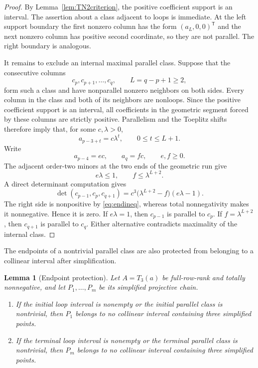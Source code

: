 \documentclass{amsart}
\numberwithin{equation}{section}
\newtheorem{lemma}[theorem]{Lemma}
\theoremstyle{definition}
\theoremstyle{remark}
\newcommand{\transpose}{\mathsf T}
\begin{document}
\begin{proof}
By Lemma~\ref{lem:TN2criterion}, the positive coefficient support is an interval.  The assertion about a class adjacent to loops is immediate.  At the left support boundary the first nonzero column has the form $(a_L,0,0)^{\transpose}$ and the next nonzero column has positive second coordinate, so they are not parallel.  The right boundary is analogous.

It remains to exclude an internal maximal parallel class.  Suppose that the consecutive columns
\[
 c_p,c_{p+1},\ldots,c_q,
 \qquad L=q-p+1\ge2,
\]
form such a class and have nonparallel nonzero neighbors on both sides.  Every column in the class and both of its neighbors are nonloops.  Since the positive coefficient support is an interval, all coefficients in the geometric segment forced by these columns are strictly positive.  Parallelism and the Toeplitz shifts therefore imply that, for some $c,\lambda>0$,
\begin{equation}\label{eq:geometric-run}
 a_{p-3+t}=c\lambda^t,
 \qquad 0\le t\le L+1.
\end{equation}
Write
\begin{equation}\label{eq:endparams}
 a_{p-4}=ec,
 \qquad
 a_q=fc,
 \qquad e,f\ge0.
\end{equation}
The adjacent order-two minors at the two ends of the geometric run give
\begin{equation}\label{eq:endineq}
 e\lambda\le1,
 \qquad
 f\le\lambda^{L+2}.
\end{equation}
A direct determinant computation gives
\begin{equation}\label{eq:parallel-trap}
 \det(c_{p-1},c_p,c_{q+1})
 =c^3\bigl(\lambda^{L+2}-f\bigr)(e\lambda-1).
\end{equation}
The right side is nonpositive by \eqref{eq:endineq}, whereas total nonnegativity makes it nonnegative.  Hence it is zero.  If $e\lambda=1$, then $c_{p-1}$ is parallel to $c_p$.  If $f=\lambda^{L+2}$, then $c_{q+1}$ is parallel to $c_q$.  Either alternative contradicts maximality of the internal class.
\end{proof}

The endpoints of a nontrivial parallel class are also protected from belonging to a collinear interval after simplification.

\begin{lemma}[Endpoint protection]\label{lem:endpoint-protection}
Let $A=T_3(a)$ be full-row-rank and totally nonnegative, and let $P_1,\ldots,P_m$ be its simplified projective chain.
\begin{enumerate}
\item If the initial loop interval is nonempty or the initial parallel class is nontrivial, then $P_1$ belongs to no collinear interval containing three simplified points.
\item If the terminal loop interval is nonempty or the terminal parallel class is nontrivial, then $P_m$ belongs to no collinear interval containing three simplified points.
\end{enumerate}
\end{lemma}
\end{document}
